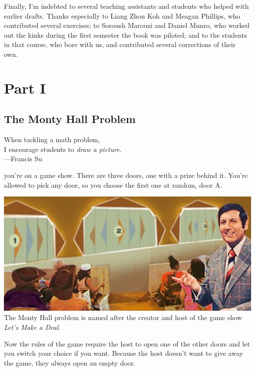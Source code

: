 \documentclass[justified]{tufte-book}
\newenvironment{epigraph}%
{
\begin{flushright}    
\begin{minipage}{20em}
\begin{flushright}
\itshape
}%
{
\end{flushright}
\end{minipage}
\end{flushright}
}
\begin{document}
Finally, I'm indebted to several teaching assistants and students who helped with earlier drafts. Thanks especially to Liang Zhou Koh and Meagan Phillips, who contributed several exercises; to Soroush Marouzi and Daniel Munro, who worked out the kinks during the first semester the book was piloted; and to the students in that course, who bore with us, and contributed several corrections of their own.

\hypertarget{part-part-i}{%
\part*{Part I}\label{part-part-i}}

\hypertarget{the-monty-hall-problem}{%
\chapter{The Monty Hall Problem}\label{the-monty-hall-problem}}

\begin{epigraph}
When tackling a math problem,\\
I encourage students to \emph{draw a picture}.\\
---Francis Su
\end{epigraph}

 you're on a game show. There are three doors, one with a prize behind it. You're allowed to pick any door, so you choose the first one at random, door A.

\begin{marginfigure}
\includegraphics{img/lets_make_a_deal.png} The Monty Hall problem is
named after the creator and host of the game show \emph{Let's Make a
Deal}.
\end{marginfigure}

Now the rules of the game require the host to open one of the other doors and let you switch your choice if you want. Because the host doesn't want to give away the game, they always open an empty door.
\end{document}
